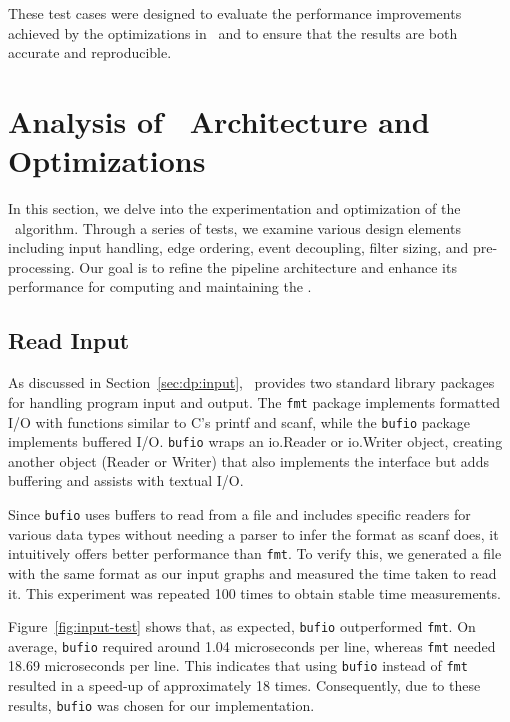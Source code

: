     These test cases were designed to evaluate the performance improvements achieved by the optimizations in \DPmst\ and to ensure that the results are both accurate and reproducible.


\section{Analysis of \DPmst\ Architecture and Optimizations}
    In this section, we delve into the experimentation and optimization of the \DPmst\ algorithm. Through a series of tests, we examine various design elements including input handling, edge ordering, event decoupling, filter sizing, and pre-processing. Our goal is to refine the pipeline architecture and enhance its performance for computing and maintaining the \mst.

    \subsection*{Read Input \label{sec:exp:input}}
    As discussed in Section~\ref{sec:dp:input}, \Go\ provides two standard library packages for handling program input and output. The \verb|fmt| package implements formatted I/O with functions similar to C's printf and scanf, while the \verb|bufio| package implements buffered I/O. \verb|bufio| wraps an io.Reader or io.Writer object, creating another object (Reader or Writer) that also implements the interface but adds buffering and assists with textual I/O.

    Since \verb|bufio| uses buffers to read from a file and includes specific readers for various data types without needing a parser to infer the format as scanf does, it intuitively offers better performance than \verb|fmt|. To verify this, we generated a file with the same format as our input graphs and measured the time taken to read it. This experiment was repeated 100 times to obtain stable time measurements.

    Figure~\ref{fig:input-test} shows that, as expected, \verb|bufio| outperformed \verb|fmt|. On average, \verb|bufio| required around 1.04 microseconds per line, whereas \verb|fmt| needed 18.69 microseconds per line. This indicates that using \verb|bufio| instead of \verb|fmt| resulted in a speed-up of approximately 18 times. Consequently, due to these results, \verb|bufio| was chosen for our implementation.

